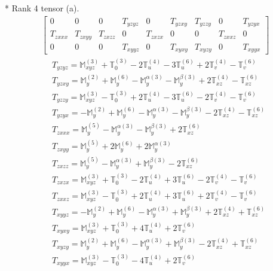 \documentclass[fleqn,8pt,landscape]{jsarticle}
\begin{document}
* Rank 4 tensor (a).
\begin{align*}
\begin{bmatrix} 0 & 0 & 0 & T_{yzyz} & 0 & T_{yzxy} & T_{yzzy} & 0 & T_{yzyx} \\ T_{zxxx} & T_{zxyy} & T_{zxzz} & 0 & T_{zxzx} & 0 & 0 & T_{zxxz} & 0 \\ 0 & 0 & 0 & T_{xyyz} & 0 & T_{xyxy} & T_{xyzy} & 0 & T_{xyyx} \end{bmatrix}
\end{align*}
\begin{align*}
& T_{yzyz} = \mathbb{M}_{xyz}^{(3)} + \mathbb{T}_{0}^{(3)} - 2 \mathbb{T}_{u}^{(4)} - 3 \mathbb{T}_{u}^{(6)} + 2 \mathbb{T}_{v}^{(4)} - \mathbb{T}_{v}^{(6)} \\
& T_{yzxy} = \mathbb{M}_{y}^{(2)} + \mathbb{M}_{y}^{(6)} - \mathbb{M}_{y}^{\alpha(3)} - \mathbb{M}_{y}^{\beta(3)} + 2 \mathbb{T}_{xz}^{(4)} - \mathbb{T}_{xz}^{(6)} \\
& T_{yzzy} = \mathbb{M}_{xyz}^{(3)} - \mathbb{T}_{0}^{(3)} + 2 \mathbb{T}_{u}^{(4)} - 3 \mathbb{T}_{u}^{(6)} - 2 \mathbb{T}_{v}^{(4)} - \mathbb{T}_{v}^{(6)} \\
& T_{yzyx} = - \mathbb{M}_{y}^{(2)} + \mathbb{M}_{y}^{(6)} - \mathbb{M}_{y}^{\alpha(3)} - \mathbb{M}_{y}^{\beta(3)} - 2 \mathbb{T}_{xz}^{(4)} - \mathbb{T}_{xz}^{(6)} \\
& T_{zxxx} = \mathbb{M}_{y}^{(5)} - \mathbb{M}_{y}^{\alpha(3)} - \mathbb{M}_{y}^{\beta(3)} + 2 \mathbb{T}_{xz}^{(6)} \\
& T_{zxyy} = \mathbb{M}_{y}^{(5)} + 2 \mathbb{M}_{y}^{(6)} + 2 \mathbb{M}_{y}^{\alpha(3)} \\
& T_{zxzz} = \mathbb{M}_{y}^{(5)} - \mathbb{M}_{y}^{\alpha(3)} + \mathbb{M}_{y}^{\beta(3)} - 2 \mathbb{T}_{xz}^{(6)} \\
& T_{zxzx} = \mathbb{M}_{xyz}^{(3)} + \mathbb{T}_{0}^{(3)} - 2 \mathbb{T}_{u}^{(4)} + 3 \mathbb{T}_{u}^{(6)} - 2 \mathbb{T}_{v}^{(4)} - \mathbb{T}_{v}^{(6)} \\
& T_{zxxz} = \mathbb{M}_{xyz}^{(3)} - \mathbb{T}_{0}^{(3)} + 2 \mathbb{T}_{u}^{(4)} + 3 \mathbb{T}_{u}^{(6)} + 2 \mathbb{T}_{v}^{(4)} - \mathbb{T}_{v}^{(6)} \\
& T_{xyyz} = - \mathbb{M}_{y}^{(2)} + \mathbb{M}_{y}^{(6)} - \mathbb{M}_{y}^{\alpha(3)} + \mathbb{M}_{y}^{\beta(3)} + 2 \mathbb{T}_{xz}^{(4)} + \mathbb{T}_{xz}^{(6)} \\
& T_{xyxy} = \mathbb{M}_{xyz}^{(3)} + \mathbb{T}_{0}^{(3)} + 4 \mathbb{T}_{u}^{(4)} + 2 \mathbb{T}_{v}^{(6)} \\
& T_{xyzy} = \mathbb{M}_{y}^{(2)} + \mathbb{M}_{y}^{(6)} - \mathbb{M}_{y}^{\alpha(3)} + \mathbb{M}_{y}^{\beta(3)} - 2 \mathbb{T}_{xz}^{(4)} + \mathbb{T}_{xz}^{(6)} \\
& T_{xyyx} = \mathbb{M}_{xyz}^{(3)} - \mathbb{T}_{0}^{(3)} - 4 \mathbb{T}_{u}^{(4)} + 2 \mathbb{T}_{v}^{(6)}
\end{align*}
\end{document}
